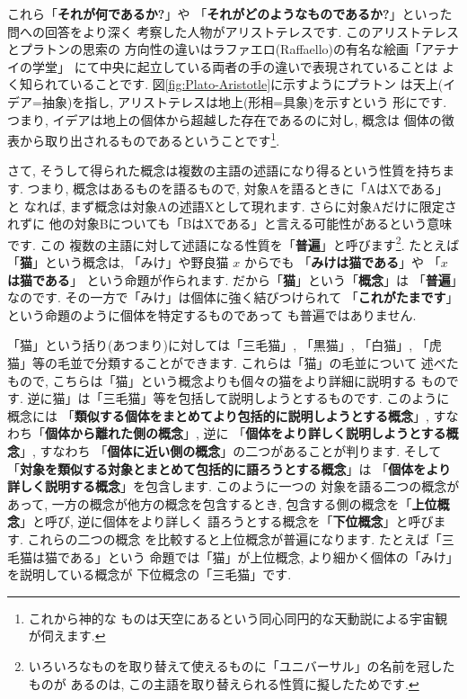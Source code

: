 \documentclass[b5j,8pt,twocolumn]{ltjsarticle}
\begin{document}
これら「\textbf{それが何であるか?}」や
「\textbf{それがどのようなものであるか?}」といった問への回答をより深く
考察した人物がアリストテレスです. このアリストテレスとプラトンの思索の
方向性の違いはラファエロ(Raffaello)の有名な絵画「アテナイの学堂」
\cite{アテナイ}にて中央に起立している両者の手の違いで表現されていることは
よく知られていることです. 図\ref{fig:Plato-Aristotle}に示すようにプラトン
は天上(イデア=抽象)を指し, アリストテレスは地上(形相=具象)を示すという
形にです. つまり, イデアは地上の個体から超越した存在であるのに対し, 概念は
個体の徴表から取り出されるものであるということです\footnote{これから神的な
ものは天空にあるという同心同円的な天動説による宇宙観が伺えます.}.
\newline

さて, そうして得られた概念は複数の主語の述語になり得るという性質を持ちます.
 つまり, 概念はあるものを語るもので, 対象Aを語るときに「AはXである」と
なれば, まず概念は対象Aの述語Xとして現れます. さらに対象Aだけに限定されずに
他の対象Bについても「BはXである」と言える可能性があるという意味です. この
複数の主語に対して述語になる性質を「\textbf{普遍}」と呼びます\footnote{
いろいろなものを取り替えて使えるものに「ユニバーサル」の名前を冠したものが
あるのは, この主語を取り替えられる性質に擬したためです.}. たとえば
「\textbf{猫}」という概念は, 「みけ」や野良猫 $x$ からでも
「\textbf{みけは猫である}」や 「\textbf{$x$ は猫である}」
という命題が作られます. だから「\textbf{猫}」という「\textbf{概念}」は
「\textbf{普遍}」なのです. その一方で「みけ」は個体に強く結びつけられて
「\textbf{これがたまです}」という命題のように個体を特定するものであって
も普遍ではありません.
\newline

「猫」という括り(あつまり)に対しては「三毛猫」, 「黒猫」, 「白猫」,
 「虎猫」等の毛並で分類することができます. これらは「猫」の毛並について
述べたもので, こちらは「猫」という概念よりも個々の猫をより詳細に説明する
ものです. 逆に猫」は「三毛猫」等を包括して説明しようとするものです.
 このように概念には
「\textbf{類似する個体をまとめてより包括的に説明しようとする概念}」,
 すなわち「\textbf{個体から離れた側の概念}」, 逆に
「\textbf{個体をより詳しく説明しようとする概念}」, すなわち
「\textbf{個体に近い側の概念}」の二つがあることが判ります. そして
「\textbf{対象を類似する対象とまとめて包括的に語ろうとする概念}」は
「\textbf{個体をより詳しく説明する概念}」を包含します. このように一つの
対象を語る二つの概念があって, 一方の概念が他方の概念を包含するとき,
 包含する側の概念を「\textbf{上位概念}」と呼び, 逆に個体をより詳しく
語ろうとする概念を「\textbf{下位概念}」と呼びます. これらの二つの概念
を比較すると上位概念が普遍になります. たとえば「三毛猫は猫である」という
命題では「猫」が上位概念, より細かく個体の「みけ」を説明している概念が
下位概念の「三毛猫」です.
\newline
\end{document}
